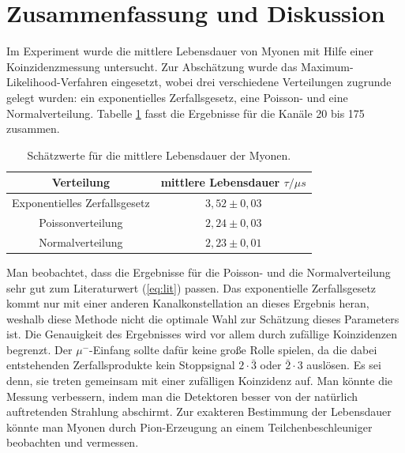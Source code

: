 \section{Zusammenfassung und Diskussion}
	Im Experiment wurde die mittlere Lebensdauer von Myonen mit Hilfe einer Koinzidenzmessung untersucht. Zur Abschätzung wurde das Maximum-Likelihood-Verfahren eingesetzt, wobei drei verschiedene Verteilungen zugrunde gelegt wurden: ein exponentielles Zerfallsgesetz, eine Poisson- und eine Normalverteilung. Tabelle \ref{tab:results} fasst die Ergebnisse für die Kanäle 20 bis 175 zusammen.
	\begin{table}[ht]
		\centering
		\begin{tabular}{c|c}
		Verteilung & mittlere Lebensdauer $\tau /\unit{\mu s}$\\
		\hline
		Exponentielles Zerfallsgesetz	&	$3,52 \pm 0,03$\\
		Poissonverteilung				&	$2,24 \pm 0,03$\\
		Normalverteilung 				&	$2,23 \pm 0,01$
		\end{tabular}
		\caption{Schätzwerte für die mittlere Lebensdauer der Myonen.}
		\label{tab:results}
	\end{table}
	Man beobachtet, dass die Ergebnisse für die Poisson- und die Normalverteilung sehr gut zum Literaturwert (\ref{eq:lit}) passen. Das exponentielle Zerfallsgesetz kommt nur mit einer anderen Kanalkonstellation an dieses Ergebnis heran, weshalb diese Methode nicht die optimale Wahl zur Schätzung dieses Parameters ist. Die Genauigkeit des Ergebnisses wird vor allem durch zufällige Koinzidenzen begrenzt. Der $\mu^-$-Einfang sollte dafür keine große Rolle spielen, da die dabei entstehenden Zerfallsprodukte kein Stoppsignal $2 \cdot \bar{3}$ oder $\bar{2} \cdot 3$ auslösen. Es sei denn, sie treten gemeinsam mit einer zufälligen Koinzidenz auf. Man könnte die Messung verbessern, indem man die Detektoren besser von der natürlich auftretenden Strahlung abschirmt. Zur exakteren Bestimmung der Lebensdauer könnte man Myonen durch Pion-Erzeugung an einem Teilchenbeschleuniger beobachten und vermessen.
	

\newpage
